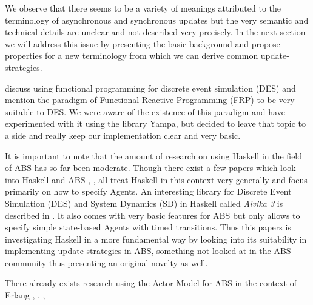 \medskip

We observe that there seems to be a variety of meanings attributed to the terminology of asynchronous and synchronous updates but the very semantic and technical details are unclear and not described very precisely. In the next section we will address this issue by presenting the basic background and propose properties for a new terminology from which we can derive common update-strategies.



\cite{jankovic_functional_2007} discuss using functional programming for discrete event simulation (DES) and mention the paradigm of Functional Reactive Programming (FRP) to be very suitable to DES. We were aware of the existence of this paradigm and have experimented with it using the library Yampa, but decided to leave that topic to a side and really keep our implementation clear and very basic.

It is important to note that the amount of research on using Haskell in the field of ABS has so far been moderate. Though there exist a few papers which look into Haskell and ABS \cite{de_jong_suitability_2014}, \cite{sulzmann_specifying_2007}, \cite{jankovic_functional_2007} all treat Haskell in this context very generally and focus primarily on how to specify Agents. An interesting library for Discrete Event Simulation (DES) and System Dynamics (SD) in Haskell called \textit{Aivika 3} is described in \cite{sorokin_aivika_2015}. It also comes with very basic features for ABS but only allows to specify simple state-based Agents with timed transitions. Thus this papers is investigating Haskell in a more fundamental way by looking into its suitability in implementing update-strategies in ABS, something not looked at in the ABS community thus presenting an original novelty as well.

There already exists research using the Actor Model for ABS in the context of Erlang \cite{varela_modelling_2004}, \cite{di_stefano_using_2005}, \cite{di_stefano_exat:_2007}, \cite{sher_agent-based_2013}